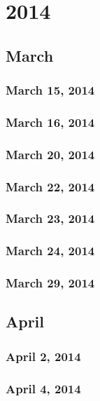 \part{2014}
\chapter{March}
\section{March 15, 2014}


\section{March 16, 2014}


\section{March 20, 2014}

\section{March 22, 2014}

\section{March 23, 2014}

\section{March 24, 2014}

\section{March 29, 2014}

\chapter{April}
\section{April 2, 2014}

\section{April 4, 2014}

